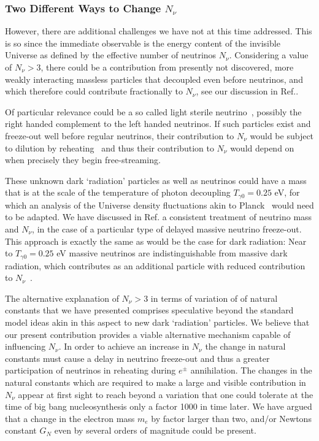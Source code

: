 \subsubsection{Two Different Ways to Change $N_\nu$}

However, there are additional challenges we have not at this time addressed. This is so since the immediate observable is the energy content of the invisible Universe as defined by the effective number of neutrinos $N_\nu$. Considering a value of   $N_\nu>3$,  there could  be a contribution from presently not discovered, more weakly interacting massless particles that decoupled even before neutrinos, and which therefore could contribute fractionally to $N_\nu$, see our discussion in Ref.\cite{Birrell:2014connect}. 

Of particular relevance could be a so called light sterile neutrino~\cite{Abazajian:2012ys}, possibly the right handed complement to the left handed neutrinos. If such particles exist and freeze-out well before regular neutrinos, their contribution to $N_\nu$ would be subject to dilution by reheating~\cite{Birrell:2014connect} and thus their contribution to $N_\nu$ would depend on when precisely they begin free-streaming.

These unknown dark `radiation' particles as well as neutrinos could have a mass that is at the scale of the temperature of photon decoupling $T_{\gamma 0}=0.25$ eV, for which an analysis of the Universe density fluctuations akin to Planck~\cite{Planck} would need to be adapted. We have  discussed in Ref.\cite{Birrell:2013_2} a consistent treatment of neutrino mass and $N_\nu$,  in the case of a particular type of delayed massive neutrino  freeze-out. This approach is exactly the same as would be the case for dark radiation:  Near to $T_{\gamma 0}=0.25$ eV massive neutrinos are indistinguishable from massive dark radiation, which contributes as an additional particle with reduced contribution to $N_\nu$~\cite{Birrell:2014connect}.

The alternative explanation of $N_\nu>3$ in terms of variation of  of natural constants that we have presented comprises  speculative beyond the standard model ideas akin in this aspect to new dark `radiation' particles. We believe that our present contribution provides a viable alternative  mechanism  capable of influencing $N_\nu$. In order to achieve an increase in $N_\nu$ the change in natural constants must cause a delay in neutrino freeze-out and thus  a greater participation of neutrinos in reheating during $e^\pm$ annihilation. The changes in the natural constants  which are required to make a large and visible contribution in $N_\nu$ appear at first sight to reach beyond a variation that one could tolerate at the time of big bang nucleosynthesis only a factor 1000 in time later. We have argued that a change in the electron mass $m_e$ by factor larger than two, and/or Newtons constant $G_N$ even by several orders of magnitude  could be present.




